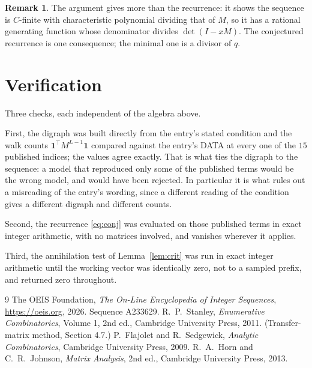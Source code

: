 \documentclass[11pt,a4paper]{article}
\theoremstyle{plain}
\theoremstyle{definition}
\newtheorem{remark}[theorem]{Remark}
\begin{document}
\begin{remark}
The argument gives more than the recurrence: it shows the sequence is $C$-finite with
characteristic polynomial dividing that of $M$, so it has a rational generating function
whose denominator divides $\det(I-xM)$. The conjectured recurrence is one consequence; the
minimal one is a divisor of $q$.
\end{remark}

\section{Verification}

Three checks, each independent of the algebra above.

First, the digraph was built directly from the entry's stated condition and the walk counts
$\mathbf{1}^{\!\top}M^{L-1}\mathbf{1}$ compared against the entry's DATA at
every one of the $15$ published indices; the values agree exactly. That is what ties
the digraph to the sequence: a model that reproduced only some of the published terms would
be the wrong model, and would have been rejected. In particular it is what rules out a
misreading of the entry's wording, since a different reading of the condition gives a
different digraph and different counts.

Second, the recurrence \eqref{eq:conj} was evaluated on those published terms in exact
integer arithmetic, with no matrices involved, and vanishes wherever it applies.

Third, the annihilation test of Lemma~\ref{lem:crit} was run in exact integer arithmetic
until the working vector was identically zero, not to a sampled prefix, and returned zero
throughout.

\begin{thebibliography}{9}
 The OEIS Foundation, \emph{The On-Line Encyclopedia of Integer
Sequences}, \url{https://oeis.org}, 2026. Sequence A233629.
 R.~P.~Stanley, \emph{Enumerative Combinatorics}, Volume 1, 2nd ed.,
Cambridge University Press, 2011. (Transfer-matrix method, Section 4.7.)
 P.~Flajolet and R.~Sedgewick, \emph{Analytic Combinatorics}, Cambridge
University Press, 2009.
 R.~A.~Horn and C.~R.~Johnson, \emph{Matrix Analysis}, 2nd ed., Cambridge
University Press, 2013.
\end{thebibliography}
\end{document}
